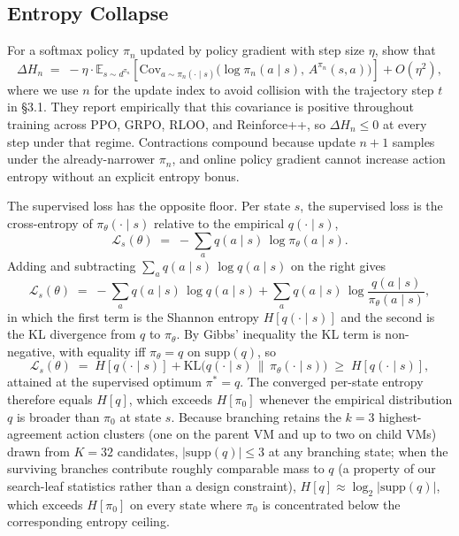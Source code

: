 \documentclass[11pt]{article}
\begin{document}
\subsection{Entropy Collapse}
\label{app:rl:entropy}

For a softmax policy $\pi_n$ updated by policy gradient with step size
$\eta$, \citet{cui2025entropy} show that
\[
    \Delta H_n
    \;=\; -\eta \cdot \mathbb{E}_{s \sim d^{\pi_n}}\!\left[
        \mathrm{Cov}_{a \sim \pi_n(\cdot \mid s)}\bigl(\log \pi_n(a \mid s),\, A^{\pi_n}(s, a)\bigr)
      \right] + O(\eta^2),
\]
where we use $n$ for the update index to avoid collision with the
trajectory step $t$ in \S3.1. They report empirically that this
covariance is positive throughout training across PPO, GRPO, RLOO, and
Reinforce++, so $\Delta H_n \le 0$ at every step under that regime.
Contractions compound because update $n+1$ samples under the
already-narrower $\pi_n$, and online policy gradient cannot increase
action entropy without an explicit entropy bonus.

The supervised loss has the opposite floor. Per state $s$, the
supervised loss is the cross-entropy of $\pi_\theta(\cdot \mid s)$
relative to the empirical $q(\cdot \mid s)$,
\[
    \mathcal{L}_s(\theta)
    \;=\; -\sum_{a} q(a \mid s)\,\log \pi_\theta(a \mid s).
\]
Adding and subtracting $\sum_a q(a \mid s)\,\log q(a \mid s)$ on the
right gives
\[
    \mathcal{L}_s(\theta)
    \;=\; -\sum_a q(a \mid s)\,\log q(a \mid s)
        + \sum_a q(a \mid s)\,\log \frac{q(a \mid s)}{\pi_\theta(a \mid s)},
\]
in which the first term is the Shannon entropy $H[q(\cdot \mid s)]$ and
the second is the KL divergence from $q$ to $\pi_\theta$.
By Gibbs' inequality the KL term is non-negative, with equality iff
$\pi_\theta = q$ on $\mathrm{supp}(q)$, so
\[
    \mathcal{L}_s(\theta)
    \;=\; H[q(\cdot \mid s)] + \mathrm{KL}\bigl(q(\cdot \mid s)\,\big\|\,\pi_\theta(\cdot \mid s)\bigr)
    \;\ge\; H[q(\cdot \mid s)],
\]
attained at the supervised optimum $\pi^* = q$. The converged per-state
entropy therefore equals $H[q]$, which exceeds $H[\pi_0]$ whenever the
empirical distribution $q$ is broader than $\pi_0$ at state $s$. Because
branching retains the $k=3$ highest-agreement action clusters (one on the parent VM and up to two on child VMs)
drawn from $K = 32$ candidates, $|\mathrm{supp}(q)| \le 3$ at any
branching state; when the surviving branches contribute roughly
comparable mass to $q$ (a property of our search-leaf statistics rather
than a design constraint), $H[q] \approx \log_2 |\mathrm{supp}(q)|$,
which exceeds $H[\pi_0]$ on every state where $\pi_0$ is concentrated
below the corresponding entropy ceiling.
\end{document}
